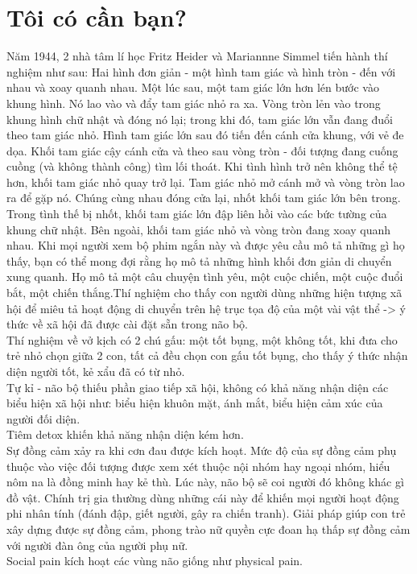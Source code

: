 \documentclass{article}
\newcommand\tab[1][1cm]{\hspace*{#1}}
\begin{document}
\section{Tôi có cần bạn?}
\tab Năm 1944, 2 nhà tâm lí học Fritz Heider và Mariannne Simmel tiến hành thí nghiệm như sau: Hai hình đơn
giản - một hình tam giác và hình tròn - đến với nhau và xoay quanh nhau.
Một lúc sau, một tam giác lớn hơn lén bước vào khung hình. Nó lao vào và
đẩy tam giác nhỏ ra xa. Vòng tròn lẻn vào trong khung hình chữ nhật và
đóng nó lại; trong khi đó, tam giác lớn vẫn đang đuổi theo tam giác nhỏ.
Hình tam giác lớn sau đó tiến đến cánh cửa khung, với vẻ đe dọa. Khối tam
giác cậy cánh cửa và theo sau vòng tròn - đối tượng đang cuống cuồng (và
không thành công) tìm lối thoát. Khi tình hình trở nên không thể tệ hơn,
khối tam giác nhỏ quay trở lại. Tam giác nhỏ mở cánh mở và vòng tròn lao
ra để gặp nó. Chúng cùng nhau đóng cửa lại, nhốt khối tam giác lớn bên
trong. Trong tình thế bị nhốt, khối tam giác lớn đập liên hồi vào các bức
tường của khung chữ nhật. Bên ngoài, khối tam giác nhỏ và vòng tròn đang
xoay quanh nhau. Khi mọi người xem bộ phim ngắn này và được yêu cầu mô tả những gì
họ thấy, bạn có thể mong đợi rằng họ mô tả những hình khối đơn giản di
chuyển xung quanh. Họ mô tả một câu chuyện tình yêu, một cuộc chiến, một cuộc đuổi bắt, một chiến thắng.Thí nghiệm cho thấy con người dùng những hiện tượng xã hội để miêu tả hoạt động di chuyển trên hệ trục 
tọa độ của một vài vật thể -> ý thức về xã hội đã được cài đặt sẵn trong não bộ.\\
\tab Thí nghiệm về vở kịch có 2 chú gấu: một tốt bụng, một không tốt, khi đưa cho trẻ nhỏ chọn giữa 2 con, tất cả đều chọn con gấu tốt bụng, cho thấy ý thức nhận diện người tốt, kẻ xẩu đã có từ nhỏ.\\
\tab Tự kỉ - não bộ thiếu phần giao tiếp xã hội, không có khả năng nhận diện các biểu hiện xã hội như:
biểu hiện khuôn mặt, ánh mắt, biểu hiện cảm xúc của người đối diện.\\
\tab Tiêm detox khiến khả năng nhận diện kém hơn.\\
\tab Sự đồng cảm xảy ra khi cơn đau được kích hoạt. Mức độ của sự đồng cảm phụ thuộc vào việc đối tượng
được xem xét thuộc nội nhóm hay ngoại nhóm, hiểu nôm na là đồng minh hay kẻ thù. Lúc này, não bộ sẽ 
coi người đó không khác gì đồ vật. Chính trị gia thường dùng những cái này để khiến mọi người hoạt động
phi nhân tính (đánh đập, giết người, gây ra chiến tranh). Giải pháp giúp con trẻ xây dựng được sự đồng 
cảm, phong trào nữ quyền cực đoan hạ thấp sự đồng cảm với người đàn ông của người phụ nữ.\\
\tab Social pain kích hoạt các vùng não giống như physical pain.\\
\end{document}
